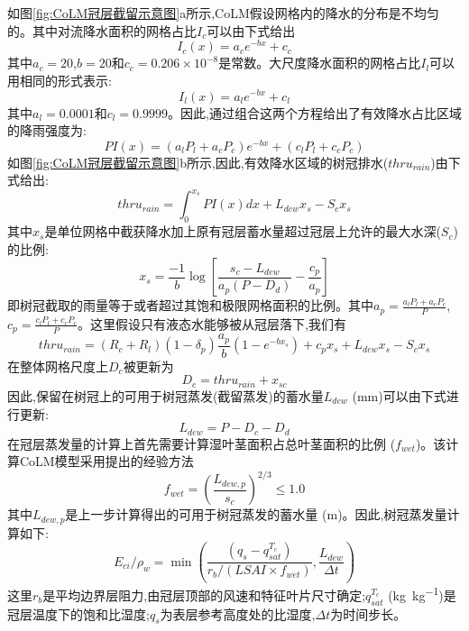 如图\ref{fig:CoLM冠层截留示意图}a所示,CoLM假设网格内的降水的分布是不均匀的。其中对流降水面积的网格占比$I_c$可以由下式给出
\begin{equation}
I_{c}(x)=a_{c} e^{-bx}+c_{c}
\end{equation}
其中$a_c=20$,$b=20$和$c_c=0.206\times10^{-8}$是常数。大尺度降水面积的网格占比$I_l$可以用相同的形式表示:
\begin{equation}
I_{l}(x)=a_{l} e^{-b x}+c_{l}
\end{equation}
其中$a_l=0.0001$和$c_l=0.9999$。因此,通过组合这两个方程给出了有效降水占比区域的降雨强度为:
\begin{equation}
P I(x)=\left(a_{l} P_{l}+a_{c} P_{c}\right) e^{-b x}+\left(c_{l} P_{l}+c_{c} P_{c}\right)
\end{equation}
如图\ref{fig:CoLM冠层截留示意图}b所示,因此,有效降水区域的树冠排水($thru_{rain}$)由下式给出:
\begin{equation}
thru_{rain}=\int_{0}^{x_{s}} P I(x) d x+L_{dew} x_{s}-S_{c} x_{s}
\end{equation}
其中$x_s$是单位网格中截获降水加上原有冠层蓄水量超过冠层上允许的最大水深($S_c$)的比例:
\begin{equation}
x_{s}=\frac{-1}{b} \log \left[\frac{s_{c}-L_{d e w}}{a_{p}\left(P-D_{d}\right)}-\frac{c_{p}}{a_{p}}\right]
\end{equation}
即树冠截取的雨量等于或者超过其饱和极限网格面积的比例。其中$a_p=\frac{a_lP_l+a_cP_c}{P}$,$c_p=\frac{c_lP_l+c_cP_c}{P}$。这里假设只有液态水能够被从冠层落下,我们有
\begin{equation}
thru_{rain}=\left(R_{c}+R_{l}\right)\left(1-\delta_{p}\right) \frac{a_{p}}{b}\left(1-e^{-b x_{s}}\right)+c_{p} x_{s}+L_{dew} x_{s}-S_{c} x_{s}
\end{equation}
在整体网格尺度上$D_c$被更新为
\begin{equation}
D_c=thru_{r a i n}+x_{s c}
\end{equation}
因此,保留在树冠上的可用于树冠蒸发(截留蒸发)的蓄水量$L_{dew}$ (mm)可以由下式进行更新:
\begin{equation}
L_{dew}={P}-D_{c}-D_{d}
\end{equation}
在冠层蒸发量的计算上首先需要计算湿叶茎面积占总叶茎面积的比例 ($f_{wet}$)。该计算CoLM模型采用\citet{dickinson1993biosphere}提出的经验方法
\begin{equation}
f_{{wet}}=\left(\frac{L_{dew, p}}{s_{c}}\right)^{2 / 3} \leq 1.0
\end{equation}
其中$L_{dew, p}$是上一步计算得出的可用于树冠蒸发的蓄水量 (m)。因此,树冠蒸发量计算如下:
\begin{equation}
E_{ci} / \rho_{w}=\min \left(\frac{\left(q_{s}-q_{sat}^{T_{c}}\right)}{r_{b} /\left(LSAI \times f_{wet}\right)}, \frac{L_{dew}}{\Delta t}\right)
\end{equation}
这里$r_b$是平均边界层阻力,由冠层顶部的风速和特征叶片尺寸确定;$q_{sat}^{T_c}$ (\unit{kg kg^{-1}})是冠层温度下的饱和比湿度;$q_s$为表层参考高度处的比湿度,$\Delta t$为时间步长。

